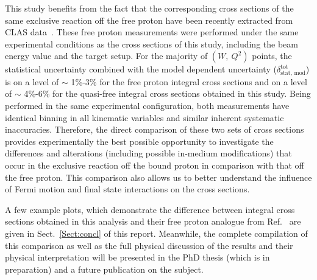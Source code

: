 This study benefits from the fact that the corresponding cross sections of the same exclusive reaction off the free proton have been recently extracted from CLAS data~\cite{Fed_an_note:2017,Fed_paper_2018}. These free proton measurements were performed under the same experimental conditions as the cross sections of this study, including the beam energy value and the target setup. For the majority of $(W,~Q^{2})$ points, the statistical uncertainty combined with the model dependent uncertainty ($\delta_{\text{stat,~mod}}^{\text{tot}}$) is on a level of $\sim$ 1\%-3\% for the free proton integral cross sections and on a level of $\sim$ 4\%-6\% for the quasi-free integral cross sections obtained in this study. Being performed in the same experimental configuration, both measurements have identical binning in all kinematic variables and similar inherent systematic inaccuracies. Therefore, the direct comparison of these two sets of cross sections provides experimentally the best possible opportunity to investigate the differences and alterations (including possible in-medium modifications) that occur in the exclusive reaction off the bound proton in comparison with that off the free proton. This comparison also allows us to better understand the influence of Fermi motion and final state interactions on the cross sections.


A few example plots, which demonstrate the difference between integral cross sections obtained in this analysis and their free proton analogue from Ref.~\cite{Fed_an_note:2017,Fed_paper_2018} are given in Sect.~\ref{Sect:concl} of this report. Meanwhile, the complete compilation of this comparison as well as the full physical discussion of the results and their physical interpretation will be presented in the PhD thesis (which is in preparation) and a future publication on the subject.



